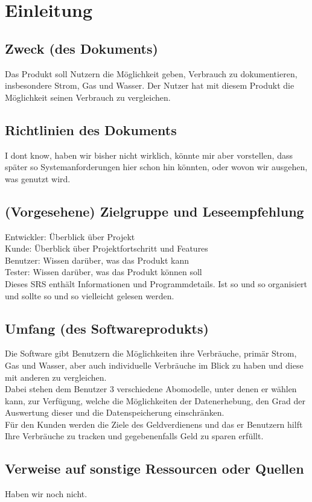 \section{Einleitung}
\subsection{Zweck (des Dokuments)}
Das Produkt soll Nutzern die Möglichkeit geben, Verbrauch zu dokumentieren, insbesondere Strom, Gas und Wasser. Der Nutzer hat mit diesem Produkt die Möglichkeit seinen Verbrauch zu vergleichen.
\subsection{Richtlinien des Dokuments}
I dont know, haben wir bisher nicht wirklich, könnte mir aber vorstellen, dass später so Systemanforderungen hier schon hin könnten, oder wovon wir ausgehen, was genutzt wird.
\subsection{(Vorgesehene) Zielgruppe und Leseempfehlung}
Entwickler: Überblick über Projekt\\
Kunde: Überblick über Projektfortschritt und Features\\
Benutzer: Wissen darüber, was das Produkt kann\\
Tester:  Wissen darüber, was das Produkt können soll\\
Dieses SRS enthält Informationen und Programmdetails.
Ist so und so organisiert und sollte so und so vielleicht gelesen werden.
\subsection{Umfang (des Softwareprodukts)}

Die Software gibt Benutzern die Möglichkeiten ihre Verbräuche, primär Strom, Gas und Wasser, aber auch individuelle Verbräuche im Blick zu haben und diese mit anderen zu vergleichen.\\
Dabei stehen dem Benutzer 3 verschiedene Abomodelle, unter denen er wählen kann, zur Verfügung, welche die Möglichkeiten der Datenerhebung, den Grad der Auswertung dieser und die Datenspeicherung einschränken.\\
Für den Kunden werden die Ziele des Geldverdienens und das er Benutzern hilft Ihre Verbräuche zu tracken und gegebenenfalls Geld zu sparen erfüllt.
\subsection{Verweise auf sonstige Ressourcen oder Quellen}
Haben wir noch nicht.